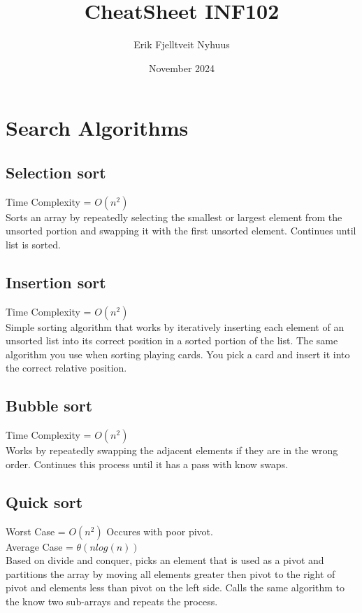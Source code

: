 \documentclass{article}
\title{CheatSheet INF102}
\author{Erik Fjelltveit Nyhuus}
\date{November 2024}
\begin{document}
\maketitle

\tableofcontents

\newpage


\section{Search Algorithms}
\subsection{Selection sort}
Time Complexity = $O(n^2)$\\
Sorts an array by repeatedly selecting the smallest or largest element from the unsorted portion
and swapping it with the first unsorted element. Continues until list is sorted.
\subsection{Insertion sort}
Time Complexity = $O(n^2)$\\
Simple sorting algorithm that works by iteratively inserting each element of an unsorted list into its correct 
position in a sorted portion of the list. The same algorithm you use when sorting playing cards. 
You pick a card and insert it into the correct relative position. 
\subsection{Bubble sort}
Time Complexity = $O(n^2)$\\
Works by repeatedly swapping the adjacent elements if they are in the wrong order. Continues 
this process until it has a pass with know swaps.
\subsection{Quick sort}
Worst Case = $O(n^2)$ Occures with poor pivot.\\ 
Average Case = $\theta(nlog(n))$\\
Based on divide and conquer, picks an element that is used as a pivot and partitions the array by moving all elements
greater then pivot to the right of pivot and elements less than pivot on the left side. Calls the same algorithm to the know two sub-arrays and repeats the process.
\end{document}
